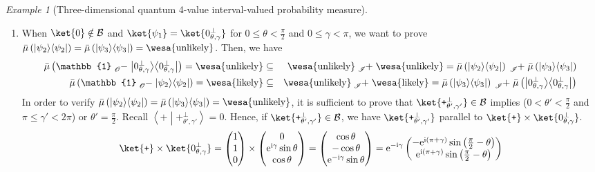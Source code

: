 \documentclass{article}
\theoremstyle{remark}
\newtheorem{example}{Example}
\newcommand{\ps}{\texttt{+}}
\newcommand{\likely}{{\mbox{\wesa{likely}}}}
\newcommand{\unlikely}{{\mbox{\wesa{unlikely}}}}
\newcommand{\rme}{\mathrm{e}}
\newcommand{\rmi}{\mathrm{i}}
\newcommand{\ip}[2]{\ensuremath{\left\langle{#1}\middle\vert{#2}\right\rangle}}
\newcommand{\op}[2]{\ensuremath{\left\vert{#1}\middle\rangle\middle\langle{#2}\right\vert}}
\newcommand{\proj}[1]{\op{#1}{#1}}
\begin{document}
\begin{example}[Three-dimensional quantum 4-value interval-valued
probability measure]
\begin{enumerate}
\begin{eqnarray*}
\end{eqnarray*}
Similarly, when $\ket{\psi_{1}}$ is $\ket{\ps}$, equation (\ref{eq:non-additive-vectors})
holds. 
\item When $\ket{0}\notin\mathcal{B}$ and $\ket{\psi_{1}}=\ket{0_{\theta,\gamma}^{\perp}}$
for $0\le\theta<\frac{\pi}{2}$ and $0\le\gamma<\pi$, we want to
prove $\bar{\mu}\left(\proj{\psi_{2}}\right)=\bar{\mu}\left(\proj{\psi_{3}}\right)=\unlikely$.
Then, we have 
\begin{eqnarray*}
\bar{\mu}\left(\mathbb{1}\tensor*[_{\mathscr{O}}]{-}{}\proj{0_{\theta,\gamma}^{\perp}}\right)=\unlikely & \subseteq & \unlikely\tensor*[_{\mathscr{I}}]{+}{}\unlikely=\bar{\mu}\left(\proj{\psi_{2}}\right)\tensor*[_{\mathscr{I}}]{+}{}\bar{\mu}\left(\proj{\psi_{3}}\right)\\
\bar{\mu}\left(\mathbb{1}\tensor*[_{\mathscr{O}}]{-}{}\proj{\psi_{2}}\right)=\likely & \subseteq & \unlikely\tensor*[_{\mathscr{I}}]{+}{}\likely=\bar{\mu}\left(\proj{\psi_{3}}\right)\tensor*[_{\mathscr{I}}]{+}{}\bar{\mu}\left(\proj{0_{\theta,\gamma}^{\perp}}\right)
\end{eqnarray*}
In order to verify $\bar{\mu}\left(\proj{\psi_{2}}\right)=\bar{\mu}\left(\proj{\psi_{3}}\right)=\unlikely$,
it is sufficient to prove that $\ket{\ps_{\theta',\gamma'}^{\perp}}\in\mathcal{B}$
implies ($0<\theta'<\frac{\pi}{2}$ and $\pi\le\gamma'<2\pi$) or
$\theta'=\frac{\pi}{2}$. Recall $\ip{\ps}{\ps_{\theta',\gamma'}^{\perp}}=0$.
Hence, if $\ket{\ps_{\theta',\gamma'}^{\perp}}\in\mathcal{B}$, we
have $\ket{\ps_{\theta',\gamma'}^{\perp}}$ parallel to $\ket{\ps}\times\ket{0_{\theta,\gamma}^{\perp}}$.
\[
\ket{\ps}\times\ket{0_{\theta,\gamma}^{\perp}}=\begin{pmatrix}1\\
1\\
0
\end{pmatrix}\times\begin{pmatrix}0\\
\rme^{\rmi\gamma}\sin\theta\\
\cos\theta
\end{pmatrix}=\begin{pmatrix}\cos\theta\\
-\cos\theta\\
\rme^{-\rmi\gamma}\sin\theta
\end{pmatrix}=\rme^{-\rmi\gamma}\begin{pmatrix}-\rme^{\rmi\left(\pi+\gamma\right)}\sin\left(\frac{\pi}{2}-\theta\right)\\
\rme^{\rmi\left(\pi+\gamma\right)}\sin\left(\frac{\pi}{2}-\theta\right)\\

\end{pmatrix}\]
\end{enumerate}
\end{example}
\end{document}
